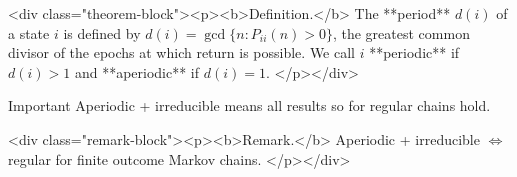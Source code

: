 <div class="theorem-block"><p><b>Definition.</b> 
The **period** $d(i)$ of a state $i$ is defined by $d(i) = \gcd\{n : P_{ii}(n) > 0\}$, the greatest common divisor of the epochs at which return is possible. We call $i$ **periodic** if $d(i) > 1$ and **aperiodic** if $d(i) = 1$.
</p></div>

\begin{newnotion}{Important}
Aperiodic + irreducible means all results so for regular chains hold.
\end{newnotion}

<div class="remark-block"><p><b>Remark.</b> 
Aperiodic + irreducible $\Leftrightarrow$ regular for finite outcome Markov chains.
</p></div>

